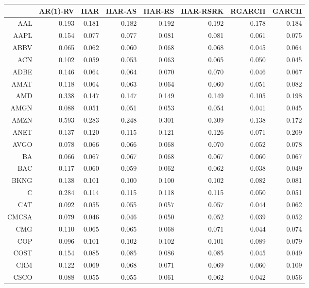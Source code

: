 \begin{table}[ht]
\centering
\begin{tabular}{rrrrrrrr}
  \hline
 & AR(1)-RV & HAR & HAR-AS & HAR-RS & HAR-RSRK & RGARCH & GARCH \\ 
  \hline
AAL & 0.193 & 0.181 & 0.182 & 0.192 & 0.192 & 0.178 & 0.184 \\ 
  AAPL & 0.154 & 0.077 & 0.077 & 0.081 & 0.081 & 0.061 & 0.075 \\ 
  ABBV & 0.065 & 0.062 & 0.060 & 0.068 & 0.068 & 0.045 & 0.064 \\ 
  ACN & 0.102 & 0.059 & 0.053 & 0.063 & 0.065 & 0.050 & 0.045 \\ 
  ADBE & 0.146 & 0.064 & 0.064 & 0.070 & 0.070 & 0.046 & 0.067 \\ 
  AMAT & 0.118 & 0.064 & 0.063 & 0.064 & 0.060 & 0.051 & 0.082 \\ 
  AMD & 0.338 & 0.147 & 0.147 & 0.149 & 0.149 & 0.105 & 0.198 \\ 
  AMGN & 0.088 & 0.051 & 0.051 & 0.053 & 0.054 & 0.041 & 0.045 \\ 
  AMZN & 0.593 & 0.283 & 0.248 & 0.301 & 0.309 & 0.138 & 0.172 \\ 
  ANET & 0.137 & 0.120 & 0.115 & 0.121 & 0.126 & 0.071 & 0.209 \\ 
  AVGO & 0.078 & 0.066 & 0.066 & 0.068 & 0.070 & 0.052 & 0.078 \\ 
  BA & 0.066 & 0.067 & 0.067 & 0.068 & 0.067 & 0.060 & 0.067 \\ 
  BAC & 0.117 & 0.060 & 0.059 & 0.062 & 0.062 & 0.038 & 0.049 \\ 
  BKNG & 0.138 & 0.101 & 0.100 & 0.100 & 0.102 & 0.082 & 0.081 \\ 
  C & 0.284 & 0.114 & 0.115 & 0.118 & 0.115 & 0.050 & 0.051 \\ 
  CAT & 0.092 & 0.055 & 0.055 & 0.057 & 0.057 & 0.044 & 0.062 \\ 
  CMCSA & 0.079 & 0.046 & 0.046 & 0.050 & 0.052 & 0.039 & 0.052 \\ 
  CMG & 0.110 & 0.065 & 0.065 & 0.068 & 0.071 & 0.044 & 0.074 \\ 
  COP & 0.096 & 0.101 & 0.102 & 0.102 & 0.101 & 0.089 & 0.079 \\ 
  COST & 0.154 & 0.085 & 0.085 & 0.086 & 0.085 & 0.045 & 0.049 \\ 
  CRM & 0.122 & 0.069 & 0.068 & 0.071 & 0.069 & 0.060 & 0.109 \\ 
  CSCO & 0.088 & 0.055 & 0.055 & 0.061 & 0.062 & 0.042 & 0.056 \\ 

\end{tabular}
\end{table}
